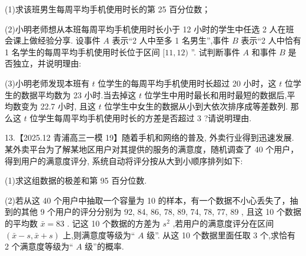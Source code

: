 \documentclass[10pt]{article}
\begin{document}
(1)求该班男生每周平均手机使用时长的第 25 百分位数；

(2)小明老师想从本班每周平均手机使用时长小于 12 小时的学生中任选 2 人在班会课上做经验分享. 设事件 \(A\) 表示“2 人中至多 1 名男生”,事件 \(B\) 表示“2 人中恰有 1 名学生的每周平均手机使用时长位于区间 \(\lbrack {11},{12})\) ”. 试判断事件 \(A\) 和事件 \(B\) 是否独立，并说明理由:

(3)小明老师发现本班有 \(t\) 位学生的每周平均手机使用时长超过 20 小时，这 \(t\) 位学生的数据平均数为 23 小时.当去掉这 \(t\) 位学生中用时最长和用时最短的数据后,平均数变为 22.7 小时, 且这 \(t\) 位学生中女生的数据从小到大依次排序成等差数列. 那么这 \(t\) 位学生每周平均手机使用时长的方差是否超过 3 ?请说明理由.

13.【2025.12 青浦高三一模 19】随着手机和网络的普及, 外卖行业得到迅速发展. 某外卖平台为了解某地区用户对其提供的服务的满意度，随机调查了 40 个用户，得到用户的满意度评分, 系统自动将评分按从大到小顺序排列如下:

\begin{center}
\end{center}

(1)求这组数据的极差和第 95 百分位数.

(2)若从这 40 个用户中抽取一个容量为 10 的样本，有一个数据不小心丢失了，抽到的其他 9 个用户的评分分别为 92, 84, 86, 78, 89, 74, 78, 77, 89 , 且这 10 个数据的平均数 \(\bar{x} = {83}\) . 记这 10 个数据的方差为 \({s}^{2}\) ,若用户的满意度评分在区间 \(\left( {\bar{x} - s,\bar{x} + s}\right)\) 上,则满意度等级为“ \(A\) 级”. 从这 10 个数据里面任取 3 个,求恰有 2 个满意度等级为“ \(A\) 级”的概率.
\end{document}
